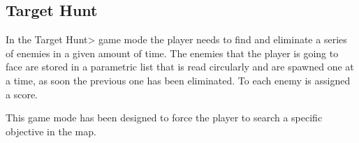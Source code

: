 \subsection{Target Hunt}

In the \<Target Hunt> game mode the player needs to find and eliminate a series of enemies in a given amount of time. The  enemies that the player is going to face are stored in a parametric list that is read circularly and are spawned one at a time, as soon the previous one has been eliminated. To each enemy is assigned a score.

\par

This game mode has been designed to force the player to search a specific objective in the map.